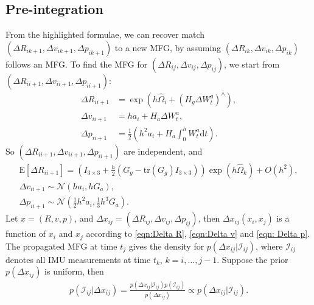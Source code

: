 \documentclass[10pt]{article}
\newcommand{\tr}[1]{\ensuremath{\mathrm{tr}\left( #1 \right)}}
\newcommand{\expect}[1]{\ensuremath{\mathrm{E}\left[ #1 \right]}}
\newcommand{\diff}[1]{\ensuremath{\mathrm{d} #1}}
\begin{document}
\subsection{Pre-integration}

From the highlighted formulae, we can recover match $(\Delta R_{ik+1}, \Delta v_{ik+1}, \Delta p_{ik+1})$ to a new MFG, by assuming $(\Delta R_{ik}, \Delta v_{ik}, \Delta p_{ik})$ follows an MFG.
To find the MFG for $(\Delta R_{ij}, \Delta v_{ij}, \Delta p_{ij})$, we start from $(\Delta R_{ii+1}, \Delta v_{ii+1}, \Delta p_{ii+1})$:
\begin{align}
	\Delta R_{ii+1} &= \exp\left( h\hat{\Omega}_i + (H_g\Delta W_t^g)^\wedge \right), \\
	\Delta v_{ii+1} &= ha_i + H_a\Delta W_t^a, \\
	\Delta p_{ii+1} &= \tfrac{1}{2} \left( h^2a_i + H_a\int_0^h W_t^a\diff{t}\right).
\end{align}
So $(\Delta R_{ii+1}, \Delta v_{ii+1}, \Delta p_{ii+1})$ are independent, and
\begin{gather}
	\expect{\Delta R_{ii+1}} = \left( I_{3\times 3} + \tfrac{h}{2}(G_g-\tr{G_g}I_{3\times 3}) \right) \exp(h\hat{\Omega}_k) + O(h^2), \\
	\Delta v_{ii+1} \sim \mathcal{N}(ha_i, hG_a), \\
	\Delta p_{ii+1} \sim \mathcal{N}(\tfrac{1}{2}h^2a_i, \tfrac{1}{3}h^3G_a).
\end{gather}
Let $x = (R,v,p)$, and $\Delta x_{ij} = (\Delta R_{ij}, \Delta v_{ij}, \Delta p_{ij})$, then $\Delta x_{ij} (x_i,x_j)$ is a function of $x_i$ and $x_j$ according to \eqref{eqn:Delta R}, \eqref{eqn:Delta v} and \eqref{eqn: Delta p}.
The propagated MFG at time $t_j$ gives the density for $p(\Delta x_{ij} | \mathcal{I}_{ij})$, where $\mathcal{I}_{ij}$ denotes all IMU measurements at time $t_k$, $k=i,\ldots,j-1$.
Suppose the prior $p(\Delta x_{ij})$ is uniform, then
\begin{align}
	p(\mathcal{I}_{ij} | \Delta x_{ij}) = \frac{p(\Delta x_{ij} | \mathcal{I}_{ij}) p(\mathcal{I}_{ij})}{p(\Delta x_{ij})} \propto p(\Delta x_{ij}|\mathcal{I}_{ij}).
\end{align}
\end{document}
